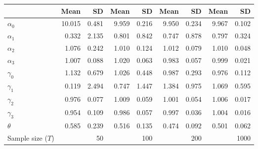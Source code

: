 
\begin{tabular}[t]{lrrrrrrrr}
\toprule
  & Mean & SD & Mean  & SD  & Mean   & SD   & Mean    & SD   \\
\midrule
$\alpha_{0}$ & 10.015 & 0.481 & 9.959 & 0.216 & 9.950 & 0.234 & 9.967 & 0.102\\
$\alpha_{1}$ & 0.332 & 2.135 & 0.801 & 0.842 & 0.747 & 0.878 & 0.797 & 0.324\\
$\alpha_{2}$ & 1.076 & 0.242 & 1.010 & 0.124 & 1.012 & 0.079 & 1.010 & 0.048\\
$\alpha_{3}$ & 1.007 & 0.088 & 1.020 & 0.063 & 0.983 & 0.057 & 0.999 & 0.021\\
$\gamma_{0}$ & 1.132 & 0.679 & 1.026 & 0.448 & 0.987 & 0.293 & 0.976 & 0.112\\
$\gamma_{1}$ & 0.119 & 2.494 & 0.747 & 1.447 & 1.384 & 0.975 & 1.069 & 0.595\\
$\gamma_{2}$ & 0.976 & 0.077 & 1.009 & 0.059 & 1.001 & 0.054 & 1.006 & 0.017\\
$\gamma_{3}$ & 0.954 & 0.109 & 0.986 & 0.057 & 0.997 & 0.036 & 1.004 & 0.016\\
$\theta$ & 0.585 & 0.239 & 0.516 & 0.135 & 0.474 & 0.092 & 0.501 & 0.062\\
Sample size ($T$) &  & 50 &  & 100 &  & 200 &  & 1000\\
\bottomrule
\end{tabular}
